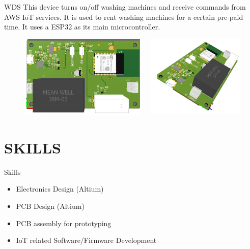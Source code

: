 \documentclass[aspectratio=169]{beamer}
\begin{document}
\begin{frame}{WDS}
  This device turns on/off washing machines and receive commands from 
  AWS IoT services. It is used to rent washing machines for a certain pre-paid
  time. It uses a ESP32 as its main microcontroller.
  \begin{figure}[H]
    \centering
    \begin{columns}[T]
      \begin{column}{.4\linewidth}
        \includegraphics[width=\linewidth]{images/wds1}
      \end{column}
      \begin{column}{.4\linewidth}
        \includegraphics[width=\linewidth]{images/wds2}
      \end{column}
    \end{columns}
  \end{figure}
\end{frame}

\section{SKILLS}
\begin{frame}{Skills}
  \begin{itemize}
    \item Electronics Design (Altium)
    \item PCB Design (Altium)
    \item PCB assembly for prototyping
    \item IoT related Software/Firmware Development
  \end{itemize}
\end{frame}
\end{document}
